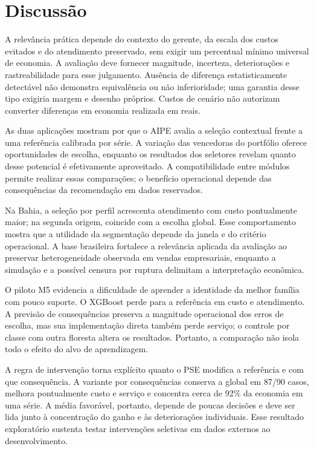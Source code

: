 \documentclass[preprint,12pt]{elsarticle}
\begin{document}
\section{Discussão}
A relevância prática depende do contexto do gerente, da escala dos custos evitados e do atendimento preservado, sem exigir um percentual mínimo universal de economia. A avaliação deve fornecer magnitude, incerteza, deteriorações e rastreabilidade para esse julgamento. Ausência de diferença estatisticamente detectável não demonstra equivalência ou não inferioridade; uma garantia desse tipo exigiria margem e desenho próprios. Custos de cenário não autorizam converter diferenças em economia realizada em reais.

As duas aplicações mostram por que o AIPE avalia a seleção contextual frente a uma referência calibrada por série. A variação das vencedoras do portfólio oferece oportunidades de escolha, enquanto os resultados dos seletores revelam quanto desse potencial é efetivamente aproveitado. A compatibilidade entre módulos permite realizar essas comparações; o benefício operacional depende das consequências da recomendação em dados reservados.

Na Bahia, a seleção por perfil acrescenta atendimento com custo pontualmente maior; na segunda origem, coincide com a escolha global. Esse comportamento mostra que a utilidade da segmentação depende da janela e do critério operacional. A base brasileira fortalece a relevância aplicada da avaliação ao preservar heterogeneidade observada em vendas empresariais, enquanto a simulação e a possível censura por ruptura delimitam a interpretação econômica.

O piloto M5 evidencia a dificuldade de aprender a identidade da melhor família com pouco suporte. O XGBoost perde para a referência em custo e atendimento. A previsão de consequências preserva a magnitude operacional dos erros de escolha, mas sua implementação direta também perde serviço; o controle por classe com outra floresta altera os resultados. Portanto, a comparação não isola todo o efeito do alvo de aprendizagem.

A regra de intervenção torna explícito quanto o PSE modifica a referência e com que consequência. A variante por consequências conserva a global em 87/90 casos, melhora pontualmente custo e serviço e concentra cerca de 92\% da economia em uma série. A média favorável, portanto, depende de poucas decisões e deve ser lida junto à concentração do ganho e às deteriorações individuais. Esse resultado exploratório sustenta testar intervenções seletivas em dados externos ao desenvolvimento.
\end{document}
